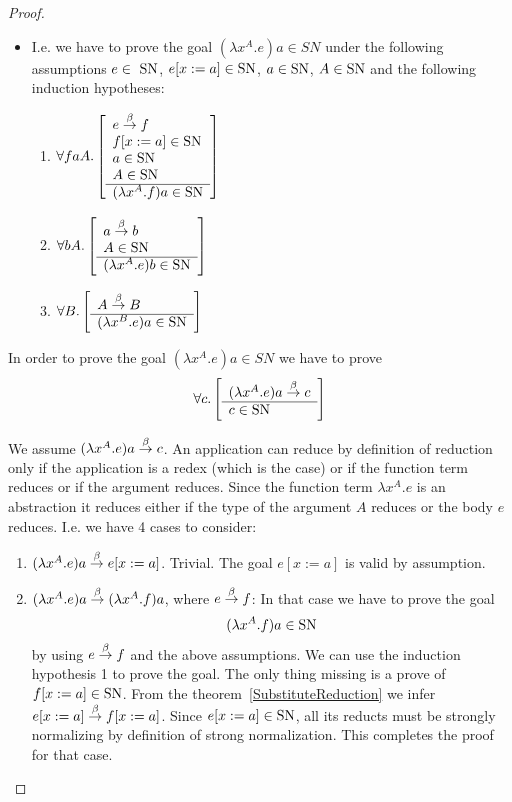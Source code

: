 \begin{theorem}
\begin{proof}
\begin{itemize}
        \item I.e. we have to prove the goal $(\lambda x^A.e)a \in SN$ under the
            following assumptions $e \in \SN$, $e[x:=a] \in \text{SN}$, $a \in \text{SN}$,
            $A \in \text{SN}$ and the following induction hypotheses:
            \begin{enumerate}
            \item $\forall faA. \left[ \begin{array}{l} 
                    e \stackrel{\beta}{\to} f
                    \\
                    f[x:=a] \in \text{SN}
                    \\
                    a \in \text{SN}
                    \\
                    A \in \text{SN}
                 \\ \hline (\lambda x^A.f)a \in \text{SN}\end{array} \right]$

            \item $\forall bA. \left[ \begin{array}{l} 
                    a \stackrel{\beta}{\to} b
                    \\
                    A \in \text{SN}
                 \\ \hline (\lambda x^A.e)b \in \text{SN}\end{array} \right]$

            \item $\forall B. \left[ \begin{array}{l} 
                    A \stackrel{\beta}{\to} B
                 \\ \hline (\lambda x^B.e)a \in \text{SN}\end{array} \right]$
            \end{enumerate}
        \end{itemize}

        In order to prove the goal $(\lambda x^A.e)a \in SN$ we have to prove
        $$
        \forall c. \left[ \begin{array}{l} (\lambda x^A.e)a \stackrel{\beta}{\to} c \\ \hline c \in \text{SN}\end{array} \right]
        $$

        We assume $(\lambda x^A.e)a \stackrel{\beta}{\to} c$. An application can reduce by
        definition of reduction only if the application is a redex (which is the
        case) or if the function term reduces or if the argument reduces. Since
        the function term $\lambda x^A.e$ is an abstraction it reduces either if
        the type of the argument $A$ reduces or the body $e$ reduces. I.e. we
        have 4 cases to consider:
        \begin{enumerate}
        \item $(\lambda x^A.e)a \stackrel{\beta}{\to} e[x:=a]$. Trivial. The goal $e[x:=a]$ is
            valid by assumption.

        \item $(\lambda x^A.e)a \stackrel{\beta}{\to} (\lambda x^A.f)a$, where $e \stackrel{\beta}{\to} f$:
            In that case we have to prove the goal
            $$
                (\lambda x^A.f)a \in \text{SN}
            $$
            by using $e \stackrel{\beta}{\to} f$ and the above assumptions. We can use the
                induction hypothesis 1 to prove the goal. The
                only thing missing is a prove of $f[x:=a] \in \text{SN}$. From the
                theorem~\ref{SubstituteReduction} we infer $e[x:=a] \stackrel{\beta}{\to}
                f[x:=a]$. Since $e[x:=a] \in \text{SN}$, all its
                reducts must be strongly normalizing by definition of strong
                normalization. This completes the proof for that case.


\end{enumerate}
\end{proof}
\end{theorem}
